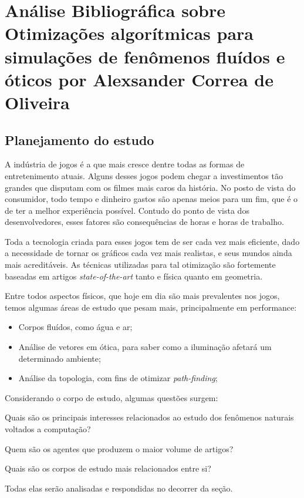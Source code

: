 \chapter{Análise Bibliográfica sobre Otimizações algorítmicas para simulações de fenômenos fluídos e óticos por Alexsander Correa de Oliveira}

\section{Planejamento do estudo}
    A indústria de jogos é a que mais cresce dentre todas as formas de entretenimento atuais. Alguns desses jogos podem chegar a investimentos tão grandes que disputam com os filmes mais caros da história. No posto de vista do consumidor, todo tempo e dinheiro gastos são apenas meios para um fim, que é o de ter a melhor experiência possível. Contudo do ponto de vista dos desenvolvedores, esses fatores são consequências de horas e horas de trabalho.
    
    Toda a tecnologia criada para esses jogos tem de ser cada vez mais eficiente, dado a necessidade de tornar os gráficos cada vez mais realistas, e seus mundos ainda mais acreditáveis. As técnicas utilizadas para tal otimização são fortemente baseadas em artigos \emph{state-of-the-art} tanto e física quanto em geometria.
    
    Entre todos aspectos físicos, que hoje em dia são mais prevalentes nos jogos, temos algumas áreas de estudo que pesam mais, principalmente em performance: 
    \begin{itemize}
        \item Corpos fluídos, como água e ar;
        \item Análise de vetores em ótica, para saber como a iluminação afetará um determinado ambiente;
        \item Análise da topologia, com fins de otimizar \emph{path-finding};
    \end{itemize}
    
    Considerando o corpo de estudo, algumas questões surgem:
    \begin{item}
        \item Quais são os principais interesses relacionados ao estudo dos fenômenos naturais voltados a computação?
        \item Quem são os agentes que produzem o maior volume de artigos?
        \item Quais são os corpos de estudo mais relacionados entre si?
    \end{item}
    Todas elas serão analisadas e respondidas no decorrer da seção.
